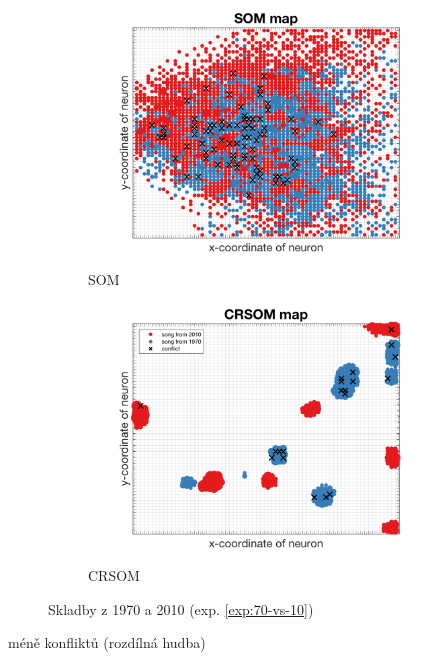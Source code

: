 \documentclass[thesis=M,czech]{FITthesis}[2012/06/26]
\begin{document}
\begin{figure}
\centering
\begin{subfigure}{.5\textwidth}
  \centering
  \includegraphics[width=.99\linewidth]{exp_70s10s_som.png}
  \caption{SOM}
  \label{fig:sub1}
\end{subfigure}%
\begin{subfigure}{.5\textwidth}
  \centering
  \includegraphics[width=.99\linewidth]{exp_70s10s_crsom.png}
  \caption{CRSOM}
  \label{fig:sub2}
\end{subfigure}
\caption{Skladby z 1970 a 2010 (exp. \ref{exp:70-vs-10})}
\label{fig:top}
\end{figure}

méně konfliktů (rozdílná hudba)
\end{document}
